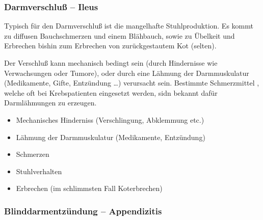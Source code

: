 \subsubsection{Darmverschluß -- Ileus}



\gMarried
{Typisch für den Darmverschluß ist die mangelhafte
Stuhlproduktion. Es kommt zu diffusen Bauchschmerzen und einem
Blähbauch, sowie zu Übelkeit und Erbrechen bishin zum
Erbrechen von zurückgestautem Kot (selten).

Der Verschluß kann mechanisch bedingt sein (durch
Hindernisse wie Verwachsungen oder Tumore), oder durch eine
Lähmung der Darmmuskulatur (Medikamente, Gifte, Entzündung
\ldots) verursacht sein. Bestimmte Schmerzmittel
, welche oft bei Krebspatienten eingesetzt
werden, sidn bekannt dafür Darmlähmungen zu erzeugen. }
{

\begin{itemize}
\item Mechanisches Hinderniss (Verschlingung, Abklemmung 
etc.)
\item Lähmung der Darmmuskulatur (Medikamente, Entzündung)
\end{itemize}


\begin{itemize}
\item Schmerzen
\item Stuhlverhalten
\item Erbrechen (im schlimmsten Fall Koterbrechen)
\end{itemize}}




\subsubsection{Blinddarmentzündung -- Appendizitis}




